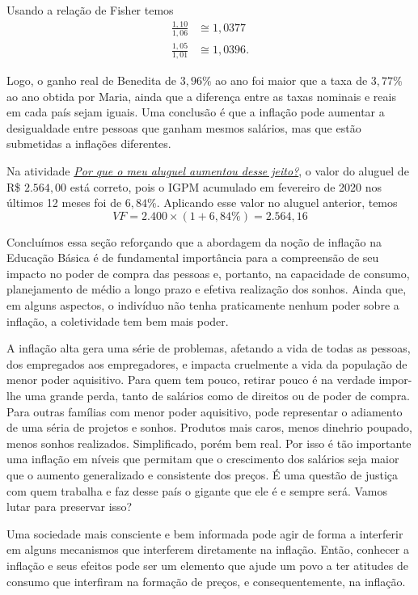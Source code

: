 Usando a relação de Fisher temos
\begin{align*}
\frac{1{,}10}{1{,}06}&\cong1{,}0377\\
\frac{1{,}05}{1{,}01}&\cong1{,}0396.
\end{align*}

Logo, o ganho real de Benedita de $3{,}96\%$ ao ano foi maior que a taxa de $3{,}77\%$ ao ano obtida por Maria, ainda que a diferença entre as taxas nominais e reais em cada país sejam iguais. Uma conclusão é que a inflação pode aumentar a desigualdade entre pessoas que ganham mesmos salários, mas que estão submetidas a inflações diferentes.

Na atividade \hyperref[meu-aluguel]{\textit{Por que o meu aluguel aumentou desse jeito?}}, o valor do aluguel de R\$ $2.564{,}00$ está correto, pois o IGPM acumulado em fevereiro de 2020 nos últimos 12 meses foi de $6{,}84$\%. Aplicando esse valor no aluguel anterior, temos
\begin{equation*}
VF=2.400\times(1+6{,}84\%)=2.564{,}16
\end{equation*}

Concluímos essa seção reforçando que a abordagem da noção de inflação na Educação Básica é de fundamental importância para a compreensão de seu impacto no poder de compra das pessoas e, portanto, na capacidade de consumo, planejamento de médio a longo prazo e efetiva realização dos sonhos. Ainda que, em alguns aspectos, o indivíduo não tenha praticamente nenhum poder sobre a inflação, a coletividade tem bem mais poder.

A inflação alta gera uma série de problemas, afetando a vida de todas as pessoas, dos empregados aos empregadores, e impacta cruelmente a vida da população de menor poder aquisitivo. Para quem tem pouco, retirar pouco é na verdade impor-lhe uma grande perda, tanto de salários como de direitos ou de poder de compra. Para outras famílias com menor poder aquisitivo, pode representar o adiamento de uma séria de projetos e sonhos. Produtos mais caros, menos dinehrio poupado, menos sonhos realizados. Simplificado, porém bem real. Por isso é tão importante uma inflação em níveis que permitam que o crescimento dos salários seja maior que o aumento generalizado e consistente dos preços. É uma questão de justiça com quem trabalha e faz desse país o gigante que ele é e sempre será. Vamos lutar para preservar isso?

Uma sociedade mais consciente e bem informada pode agir de forma a interferir em alguns mecanismos que interferem diretamente na inflação. Então, conhecer a inflação e seus efeitos pode ser um elemento que ajude um povo a ter atitudes de consumo que interfiram na formação de preços, e consequentemente, na inflação.

